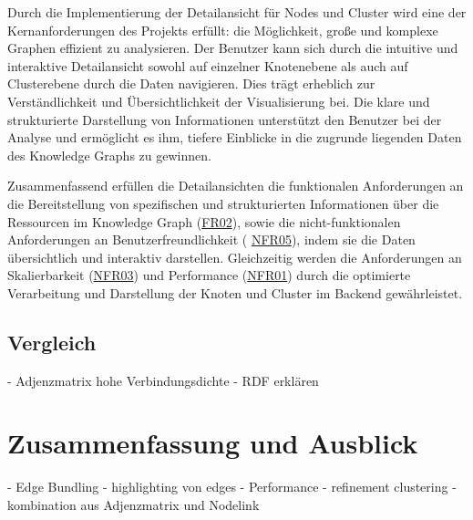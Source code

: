 Durch die Implementierung der Detailansicht für Nodes und Cluster wird eine der Kernanforderungen des Projekts erfüllt: die Möglichkeit, große und komplexe Graphen effizient zu analysieren. Der Benutzer kann sich durch die intuitive und interaktive Detailansicht sowohl auf einzelner Knotenebene als auch auf Clusterebene durch die Daten navigieren. Dies trägt erheblich zur Verständlichkeit und Übersichtlichkeit der Visualisierung bei. Die klare und strukturierte Darstellung von Informationen unterstützt den Benutzer bei der Analyse und ermöglicht es ihm, tiefere Einblicke in die zugrunde liegenden Daten des Knowledge Graphs zu gewinnen.

Zusammenfassend erfüllen die Detailansichten die funktionalen Anforderungen an die Bereitstellung von spezifischen und strukturierten Informationen über die Ressourcen im Knowledge Graph (\hyperref[FR02]{FR02}), sowie die nicht-funktionalen Anforderungen an Benutzerfreundlichkeit ( \hyperref[NFR05]{NFR05}), indem sie die Daten übersichtlich und interaktiv darstellen. Gleichzeitig werden die Anforderungen an Skalierbarkeit (\hyperref[NFR03]{NFR03}) und Performance (\hyperref[NFR01]{NFR01}) durch die optimierte Verarbeitung und Darstellung der Knoten und Cluster im Backend gewährleistet.





\section{Vergleich}
\label{realization:comparison}

- Adjenzmatrix hohe Verbindungsdichte
- RDF erklären

\chapter{Zusammenfassung und Ausblick}

- Edge Bundling
- highlighting von edges
- Performance
- refinement clustering
- kombination aus Adjenzmatrix und Nodelink